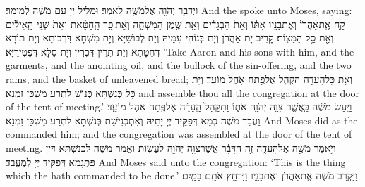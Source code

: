 \newperek
{}
{וַיְדַבֵּ֥ר יְהֹוָ֖ה אֶל\maqqaf מֹשֶׁ֥ה לֵּאמֹֽר׃}
{וּמַלֵּיל יְיָ עִם מֹשֶׁה לְמֵימַר׃}
{And the \lord\space spoke unto Moses, saying:}{}
{קַ֤ח אֶֽת\maqqaf אַהֲרֹן֙ וְאֶת\maqqaf בָּנָ֣יו אִתּ֔וֹ וְאֵת֙ הַבְּגָדִ֔ים וְאֵ֖ת שֶׁ֣מֶן הַמִּשְׁחָ֑ה וְאֵ֣ת \legarmeh  פַּ֣ר הַֽחַטָּ֗את וְאֵת֙ שְׁנֵ֣י הָֽאֵילִ֔ים וְאֵ֖ת סַ֥ל הַמַּצּֽוֹת׃}
{קָרֵיב יָת אַהֲרֹן וְיָת בְּנוֹהִי עִמֵּיהּ וְיָת לְבוּשַׁיָּא וְיָת מִשְׁחָא דִּרְבוּתָא וְיָת תּוֹרָא דְּחַטָּתָא וְיָת תְּרֵין דִּכְרִין וְיָת סַלָּא דְּפַטִּירַיָּא׃}
{’Take Aaron and his sons with him, and the garments, and the anointing oil, and the bullock of the sin-offering, and the two rams, and the basket of unleavened bread;}{}
{וְאֵ֥ת כׇּל\maqqaf הָעֵדָ֖ה הַקְהֵ֑ל אֶל\maqqaf פֶּ֖תַח אֹ֥הֶל מוֹעֵֽד׃}
{וְיָת כָּל כְּנִשְׁתָּא כְּנוֹשׁ לִתְרַע מַשְׁכַּן זִמְנָא׃}
{and assemble thou all the congregation at the door of the tent of meeting.’}{}
{וַיַּ֣עַשׂ מֹשֶׁ֔ה כַּֽאֲשֶׁ֛ר צִוָּ֥ה יְהֹוָ֖ה אֹת֑וֹ וַתִּקָּהֵל֙ הָֽעֵדָ֔ה אֶל\maqqaf פֶּ֖תַח אֹ֥הֶל מוֹעֵֽד׃}
{וַעֲבַד מֹשֶׁה כְּמָא דְּפַקֵּיד יְיָ יָתֵיהּ וְאִתְכְּנֵישַׁת כְּנִשְׁתָּא לִתְרַע מַשְׁכַּן זִמְנָא׃}
{And Moses did as the \lord\space commanded him; and the congregation was assembled at the door of the tent of meeting.}{}
{וַיֹּ֥אמֶר מֹשֶׁ֖ה אֶל\maqqaf הָעֵדָ֑ה זֶ֣ה הַדָּבָ֔ר אֲשֶׁר\maqqaf צִוָּ֥ה יְהֹוָ֖ה לַעֲשֽׂוֹת׃}
{וַאֲמַר מֹשֶׁה לִכְנִשְׁתָּא דֵּין פִּתְגָמָא דְּפַקֵּיד יְיָ לְמֶעֱבַד׃}
{And Moses said unto the congregation: ‘This is the thing which the \lord\space hath commanded to be done.’}{}
{וַיַּקְרֵ֣ב מֹשֶׁ֔ה אֶֽת\maqqaf אַהֲרֹ֖ן וְאֶת\maqqaf בָּנָ֑יו וַיִּרְחַ֥ץ אֹתָ֖ם בַּמָּֽיִם׃}
